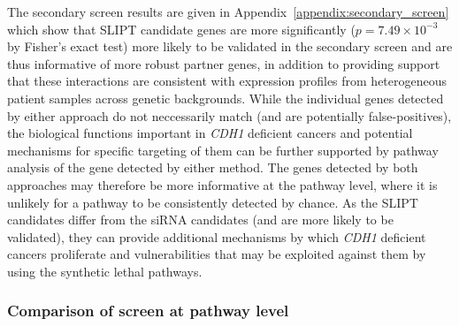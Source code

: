 The secondary screen results are given in Appendix~\ref{appendix:secondary_screen} which show that SLIPT candidate genes are more significantly ($p=7.49 \times 10^{-3}$ by Fisher's exact test) more  likely to be validated in the secondary screen and are thus informative of more robust partner genes, in addition to providing support that these interactions are consistent with expression profiles from heterogeneous patient samples across genetic backgrounds. While the individual genes detected by either approach do not neccessarily match (and are potentially false-positives), the biological functions important in \textit{CDH1} deficient cancers and potential mechanisms for specific targeting of them can be further supported by pathway analysis of the gene detected by either method. The genes detected by both approaches may therefore be more informative at the pathway level, where it is unlikely for a pathway to be consistently detected by chance. As the SLIPT candidates differ from the siRNA candidates (and are more likely to be validated), they can provide additional mechanisms by which \textit{CDH1} deficient cancers proliferate and vulnerabilities that may be exploited against them by using the synthetic lethal pathways.

\FloatBarrier

\subsubsection{Comparison of screen at pathway level}  \label{chapt3:compare_pathway}

